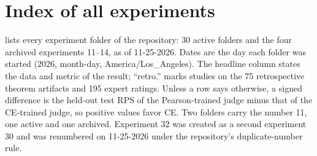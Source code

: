 \section{Index of all experiments}
\label{app:index}

 lists every experiment folder of the repository: 30 active folders and the four archived experiments 11--14, as of 11-25-2026.
Dates are the day each folder was started (2026, month-day, America/Los\_Angeles).
The headline column states the data and metric of the result; ``retro.'' marks studies on the 75 retrospective theorem artifacts and 195 expert ratings.
Unless a row says otherwise, a signed difference is the held-out test RPS of the Pearson-trained judge minus that of the CE-trained judge, so positive values favor CE.
Two folders carry the number 11, one active and one archived. Experiment 32 was created as a second experiment 30 and was renumbered on 11-25-2026 under the repository's duplicate-number rule.

